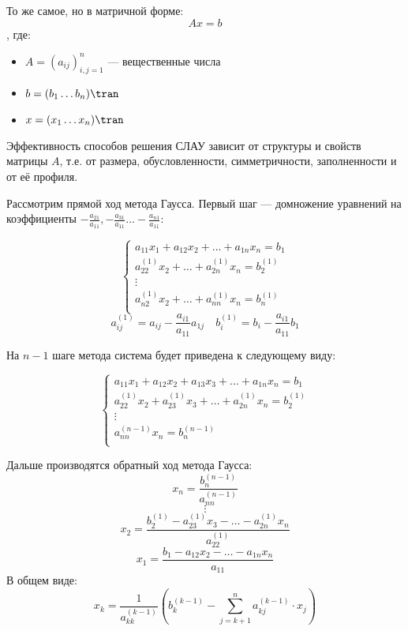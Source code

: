 То же самое, но в матричной форме:
\[Ax = b\]
, где:
\begin{itemize}
    \item \(A = (a_{ij})_{i,j = 1}^n\) --- вещественные числа
    \item \(b = (b_1 \dots b_n)\tran \)
    \item \(x = (x_1 \dots x_n)\tran \)
\end{itemize}

Эффективность способов решения СЛАУ зависит от структуры и свойств матрицы \(A\), т.е. от размера, обусловленности, симметричности, заполненности и от её профиля.

Рассмотрим прямой ход метода Гаусса. Первый шаг --- домножение уравнений на коэффициенты \( - \frac{a_{21}}{a_{11}}, - \frac{a_{31}}{a_{11}} \dots - \frac{a_{n1}}{a_{11}}\):

\begin{equation}
    \label{СЛАУ первый шаг}
    \begin{cases}
        a_{11} x_1 + a_{12} x_2 + \dots + a_{1n} x_n = b_1      \\
        a_{22}^{(1)} x_2 + \dots + a_{2n}^{(1)} x_n = b_2^{(1)} \\
        \vdots                                                  \\
        a_{n2}^{(1)} x_2 + \dots + a_{nn}^{(1)} x_n = b_n^{(1)} \\
    \end{cases}
\end{equation}
\[a_{ij}^{(1)} = a_{ij} - \frac{a_{i1}}{a_{11}} a_{1j} \quad b_i^{(1)} = b_i - \frac{a_{i1}}{a_{11}} b_1 \]

На \(n - 1\) шаге метода система будет приведена к следующему виду:

\begin{equation}
    \begin{cases}
        a_{11} x_1 + a_{12} x_2 + a_{13} x_3 + \dots + a_{1n} x_n = b_1            \\
        a_{22}^{(1)} x_2 + a_{23}^{(1)} x_3 + \dots + a_{2n}^{(1)} x_n = b_2^{(1)} \\
        \vdots                                                                     \\
        a_{nn}^{(n - 1)} x_n = b_n^{(n - 1)}                                       \\
    \end{cases}
\end{equation}

Дальше производятся обратный ход метода Гаусса:
\[x_n = \frac{b_n^{(n - 1)}}{a_{nn}^{(n - 1)}}\]
\[\vdots\]
\[x_2 = \frac{b_2^{(1)} - a_{23}^{(1)} x_3 - \dots - a_{2n}^{(1)} x_n}{a_{22}^{(1)}}\]
\[x_1 = \frac{b_1 - a_{12} x_2 - \dots - a_{1n} x_n}{a_{11}}\]
В общем виде:
\[x_k = \frac{1}{a_{kk}^{(k - 1)}} \left( b_k^{(k - 1)} - \sum_{j = k + 1}^n a_{kj}^{(k - 1)} \cdot x_j \right)\]

